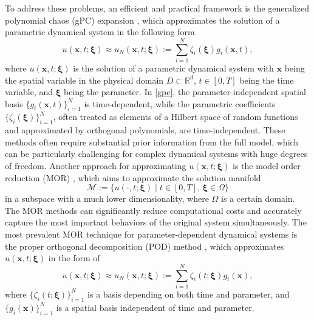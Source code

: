 \documentclass[10pt,a4paper]{article}
\numberwithin{equation}{section}
\numberwithin{lemma}{section}
\numberwithin{example}{section}
\numberwithin{definition}{section}
\numberwithin{assumption}{section}
\numberwithin{theorem}{section}
\numberwithin{proposition}{section}
\numberwithin{corollary}{section}
\numberwithin{remark}{section}
\begin{document}
To address these problems, an efficient and practical framework is the generalized polynomial chaos (gPC) expansion \cite{Xiu2002the, Xiu2003modeling, E2008algebraic, Hoang2012REGULARITYAG, K2020long, V2020analy}, 
which approximates the solution of a parametric dynamical system in the following form
\begin{equation}
\label{gpc}
u(\bm{x},t;\bm{\xi})\approx 
u_N(\bm{x},t;\bm{\xi})
:=\sum_{i=1}^{N}\zeta_i(\bm{\xi})g_i(\bm{x},t),
\end{equation}
where $u(\bm{x},t;\bm{\xi})$ is the solution of a parametric dynamical system with 
$\bm{x}$ being the spatial variable in the physical domain $D\subset\mathbb{R}^{d}$, 
$t\in [0, T]$ being the time variable, and $\bm{\xi}$ being the parameter. 
In \eqref{gpc}, the parameter-independent spatial basis $\{g_i(\bm{x},t)\}_{i=1}^{N}$ is time-dependent, 
while the parametric coefficients $\{\zeta_i(\bm{\xi})\}_{i=1}^{N}$, often treated as elements of a Hilbert space of random functions and approximated by orthogonal polynomials, are time-independent.
These methods often require substantial prior information from the full model, which can be particularly challenging for complex dynamical systems with huge degrees of freedom. 
Another approach for approximating $u(\bm{x},t;\bm{\xi})$ is the model order reduction (MOR) \cite{T2008model,C2013nonintrusive,U2014model,P2015a,Hesthaven2022reduced,Song2024a,Li2024an}, 
which aims to approximate the solution manifold 
$$
\mathcal{M}:=\{u(\cdot,t;\bm{\xi})\mid  
t\in [0, T],\,
\bm{\xi} \in \Omega\}
$$
in a subspace with a much lower dimensionality, where $\Omega$ is a certain domain. 
The MOR methods can significantly reduce computational costs and accurately capture the most important behaviors of the original system simultaneously. 
The most prevalent MOR technique for parameter-dependent dynamical systems is the proper orthogonal decomposition (POD) method \cite{M2019data,R2019reduced,X2021non,Sleeman2022goal}, which approximates $u(\bm{x},t;\bm{\xi})$ in the form of
$$
u(\bm{x},t;\bm{\xi})\approx u_N(\bm{x},t;\bm{\xi}):=\sum_{i=1}^{N}\zeta_i(t;\bm{\xi})g_i(\bm{x}),
$$
where $\{\zeta_i(t;\bm{\xi})\}_{i=1}^{N}$ is a
basis depending on both time and parameter, 
and $\{g_i(\bm{x})\}_{i=1}^{N}$ is a spatial basis independent of time and parameter.
\end{document}
